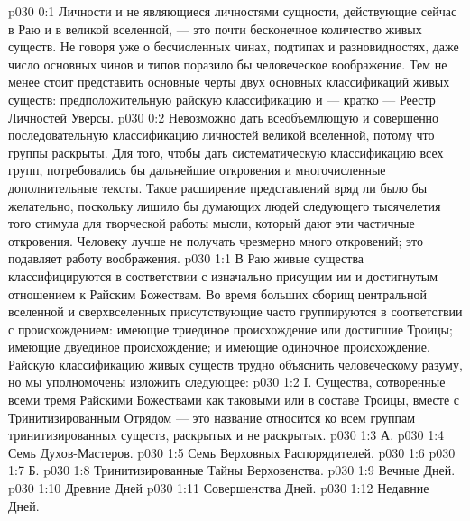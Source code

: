 \author{Могучий Вестник}
\vs p030 0:1 Личности и не являющиеся личностями сущности, действующие сейчас в Раю и в великой вселенной, --- это почти бесконечное количество живых существ. Не говоря уже о бесчисленных чинах, подтипах и разновидностях, даже число основных чинов и типов поразило бы человеческое воображение. Тем не менее стоит представить основные черты двух основных классификаций живых существ: предположительную райскую классификацию и --- кратко --- Реестр Личностей Уверсы.
\vs p030 0:2 Невозможно дать всеобъемлющую и совершенно последовательную классификацию личностей великой вселенной, потому что  группы раскрыты. Для того, чтобы дать систематическую классификацию всех групп, потребовались бы дальнейшие откровения и многочисленные дополнительные тексты. Такое расширение представлений вряд ли было бы желательно, поскольку лишило бы думающих людей следующего тысячелетия того стимула для творческой работы мысли, который дают эти частичные откровения. Человеку лучше не получать чрезмерно много откровений; это подавляет работу воображения.
\vs p030 1:1 В Раю живые существа классифицируются в соответствии с изначально присущим им и достигнутым отношением к Райским Божествам. Во время больших сборищ центральной вселенной и сверхвселенных присутствующие часто группируются в соответствии с происхождением: имеющие триединое происхождение или достигшие Троицы; имеющие двуединое происхождение; и имеющие одиночное происхождение. Райскую классификацию живых существ трудно объяснить человеческому разуму, но мы уполномочены изложить следующее:
\vs p030 1:2 \pc I.  Существа, сотворенные всеми тремя Райскими Божествами как таковыми или в составе Троицы, вместе с Тринитизированным Отрядом --- это название относится ко всем группам тринитизированных существ, раскрытых и не раскрытых.
\vs p030 1:3 \pc А. 
\vs p030 1:4 \bibnobreakspace Семь Духов\hyp{}Мастеров.
\vs p030 1:5 \bibnobreakspace Семь Верховных Распорядителей.
\vs p030 1:6 \bibnobreakspace {}
\vs p030 1:7 \pc Б. 
\vs p030 1:8 \bibnobreakspace Тринитизированные Тайны Верховенства.
\vs p030 1:9 \bibnobreakspace Вечные Дней.
\vs p030 1:10 \bibnobreakspace Древние Дней
\vs p030 1:11 \bibnobreakspace Совершенства Дней.
\vs p030 1:12 \bibnobreakspace Недавние Дней.
